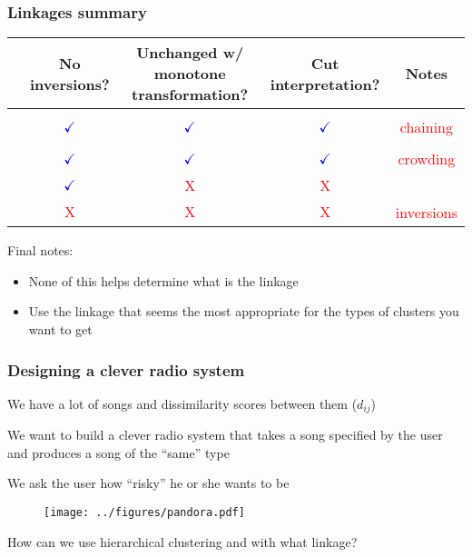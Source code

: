 \documentclass{beamer}
\begin{document}
\begin{frame}[fragile]
\frametitle{Linkages summary}

\begin{table}
\begin{tabular}{l|cccc}
 & \parbox{.93in}{No inversions?} & \parbox{.9in}{Unchanged w/ monotone  transformation?} & \parbox{.55in}{Cut interpretation?} & Notes \\
 \hline \\
 & 
\textcolor{blue}{$\checkmark$} & \textcolor{blue}{$\checkmark$}  & \textcolor{blue}{$\checkmark$} & 
\textcolor{red}{chaining} \\
\hline \\
 &
\textcolor{blue}{$\checkmark$} & \textcolor{blue}{$\checkmark$} & \textcolor{blue}{$\checkmark$} & 
\textcolor{red}{crowding}\\
\hline \\
 &
\textcolor{blue}{$\checkmark$} & \textcolor{red}{$\text{X}$} & \textcolor{red}{$\text{X}$} & \\
\hline \\
 &
\textcolor{red}{$\text{X}$} & \textcolor{red}{$\text{X}$} & \textcolor{red}{$\text{X}$} & 
\textcolor{red}{inversions} \\
\hline 
\end{tabular}
\end{table}
Final notes:

\begin{itemize}
\item None of this helps determine what is the  linkage
\item Use the linkage that seems the most appropriate for the types of clusters you want to get
\end{itemize}
\end{frame}


\begin{frame}[fragile]
\frametitle{Designing a clever radio system}
We have a lot of songs and dissimilarity scores between them ($d_{ij}$)

\vsp
We want to build a clever radio system that takes a song specified by the user and produces
a song of the ``same'' type

\vsp
We ask the user how ``risky'' he or she wants to be

\begin{figure}
\centering
  \texttt{[image: ../figures/pandora.pdf]} 
\end{figure}

How can we use hierarchical clustering and with what linkage?
\end{frame}
\end{document}
